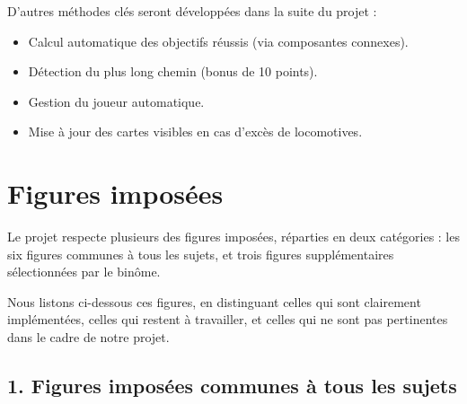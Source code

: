 \documentclass[a4paper,12pt]{report}
\begin{document}
D'autres méthodes clés seront développées dans la suite du projet :
\begin{itemize}
    \item Calcul automatique des objectifs réussis (via composantes connexes).
    \item Détection du plus long chemin (bonus de 10 points).
    \item Gestion du joueur automatique.
    \item Mise à jour des cartes visibles en cas d'excès de locomotives.
\end{itemize}



\chapter{Figures imposées}

Le projet respecte plusieurs des figures imposées, réparties en deux catégories :
les six figures communes à tous les sujets, et trois figures supplémentaires sélectionnées par le binôme.

Nous listons ci-dessous ces figures, en distinguant celles qui sont clairement implémentées,
celles qui restent à travailler, et celles qui ne sont pas pertinentes dans le cadre de notre projet.

\section*{1. Figures imposées communes à tous les sujets}
\end{document}
